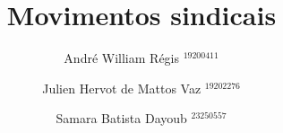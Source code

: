 \documentclass{beamer}
\title{Movimentos sindicais}
\author{André William Régis $^{19200411}$ \\
	\and Julien Hervot de Mattos Vaz $^{19202276}$ \\
	\and Samara Batista Dayoub $^{23250557}$ \\
}
\institute{UFSC}
\begin{document}
\frame{\titlepage}


\end{document}
